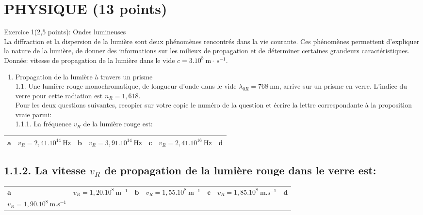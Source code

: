 \section*{PHYSIQUE (13 points)}
Exercice 1(2,5 points): Ondes lumineuses\\
La diffraction et la dispersion de la lumière sont deux phénomènes rencontrés dans la vie courante. Ces phénomènes permettent d'expliquer la nature de la lumière, de donner des informations sur les milieux de propagation et de déterminer certaines grandeurs caractéristiques.\\
Donnée: vitesse de propagation de la lumière dans le vide $c=3.10^{8} \mathrm{~m} \cdot \mathrm{~s}^{-1}$.

\begin{enumerate}
  \item Propagation de la lumière à travers un prisme\\
1.1. Une lumière rouge monochromatique, de longueur d'onde dans le vide $\lambda_{0 R}=768 \mathrm{~nm}$, arrive sur un prisme en verre. L'indice du verre pour cette radiation est $n_{R}=1,618$.\\
Pour les deux questions suivantes, recopier sur votre copie le numéro de la question et écrire la lettre correspondante à la proposition vraie parmi:\\
1.1.1. La fréquence $v_{R}$ de la lumière rouge est:
\end{enumerate}

\begin{center}
\begin{tabular}{|l|l|l|l|l|l|l|}
\hline
$\mathbf{a}$ & $v_{R}=2,41.10^{14} \mathrm{~Hz}$ & $\mathbf{b}$ & $v_{R}=3,91.10^{14} \mathrm{~Hz}$ & $\mathbf{c}$ & $v_{R}=2,41.10^{16} \mathrm{~Hz}$ & $\mathbf{d}$ \\
\hline
\end{tabular}
\end{center}

\subsection*{1.1.2. La vitesse $v_{R}$ de propagation de la lumière rouge dans le verre est:}
\begin{center}
\begin{tabular}{|l|l|l|l|l|l|l|}
\hline
$\mathbf{a}$ & $v_{R}=1,20.10^{8} \mathrm{~m}^{-1}$ & $\mathbf{b}$ & $v_{R}=1,55.10^{8} \mathrm{~m}^{-1}$ & $\mathbf{c}$ & $v_{R}=1,85.10^{8} \mathrm{~m} . \mathrm{s}^{-1}$ & $\mathbf{d}$ \\
$v_{R}=1,90.10^{8} \mathrm{~m} . \mathrm{s}^{-1}$ &  &  &  &  &  &  \\
\hline
\end{tabular}
\end{center}

